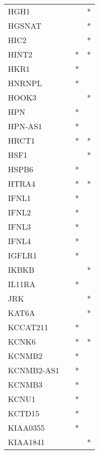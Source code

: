 \begin{longtable}{lccc}
HGH1         &           &     &       * \\
HGSNAT       &           &     &       * \\
HIC2         &           &     &       * \\
HINT2        &           &   * &       * \\
HKR1         &           &   * &         \\
HNRNPL       &           &   * &         \\
HOOK3        &           &     &       * \\
HPN          &           &   * &         \\
HPN-AS1      &           &   * &         \\
HRCT1        &           &   * &       * \\
HSF1         &           &     &       * \\
HSPB6        &           &   * &         \\
HTRA4        &           &   * &       * \\
IFNL1        &           &   * &         \\
IFNL2        &           &   * &         \\
IFNL3        &           &   * &         \\
IFNL4        &           &   * &         \\
IGFLR1       &           &   * &         \\
IKBKB        &           &     &       * \\
IL11RA       &           &   * &         \\
JRK          &           &     &       * \\
KAT6A        &           &     &       * \\
KCCAT211     &           &   * &         \\
KCNK6        &           &   * &       * \\
KCNMB2       &           &   * &         \\
KCNMB2-AS1   &           &   * &         \\
KCNMB3       &           &   * &         \\
KCNU1        &           &   * &         \\
KCTD15       &           &   * &         \\
KIAA0355     &           &   * &         \\
KIAA1841     &           &     &       * \\

\end{longtable}
